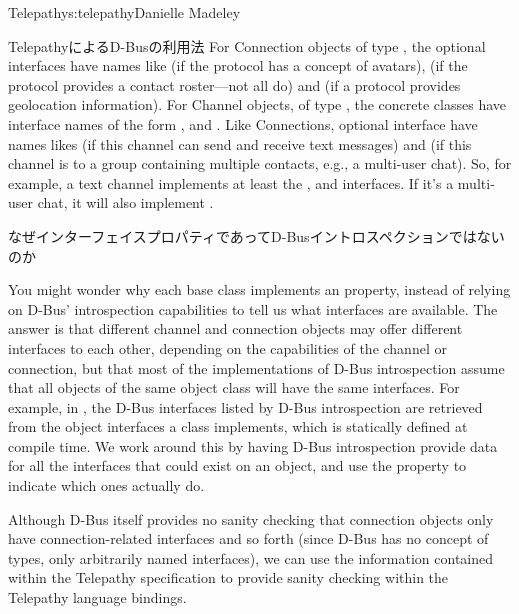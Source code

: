 \begin{aosachapter}{Telepathy}{s:telepathy}{Danielle Madeley}
\begin{aosasect1}{TelepathyによるD-Busの利用法}
For Connection objects of type , the optional
interfaces have names like 
(if the protocol has a concept of avatars),
 (if the protocol provides
a contact roster---not all do) and
 (if a protocol provides
geolocation information).  For Channel objects, of type
, the concrete classes have interface names of the
form ,  and
. Like Connections, optional
interface have names likes  (if
this channel can send and receive text messages) and
 (if this channel is to a group
containing multiple contacts, e.g., a multi-user chat).  So, for
example, a text channel implements at least the ,
 and 
interfaces.  If it's a multi-user chat, it will also implement
.

\begin{aosabox}{なぜインターフェイスプロパティであってD-Busイントロスペクションではないのか}

You might wonder why each base class implements an 
property, instead of relying on D-Bus' introspection capabilities to
tell us what interfaces are available.  The answer is that different
channel and connection objects may offer different interfaces to each
other, depending on the capabilities of the channel or connection, but
that most of the implementations of D-Bus introspection assume that
all objects of the same object class will have the same interfaces.
For example, in , the D-Bus interfaces listed by
D-Bus introspection are retrieved from the object interfaces a class
implements, which is statically defined at compile time.  We work
around this by having D-Bus introspection provide data for all the
interfaces that could exist on an object, and use the
 property to indicate which ones actually do.

\end{aosabox}

Although D-Bus itself provides no sanity checking that connection
objects only have connection-related interfaces and so forth (since
D-Bus has no concept of types, only arbitrarily named interfaces), we
can use the information contained within the Telepathy specification
to provide sanity checking within the Telepathy language bindings.


\end{aosasect1}
\end{aosachapter}
